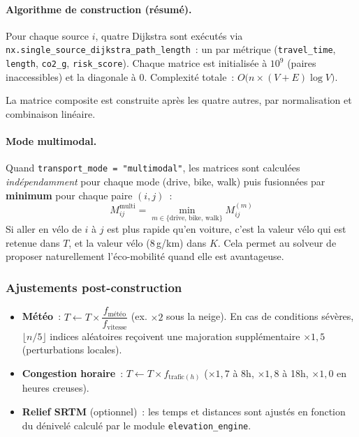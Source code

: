 \documentclass[a4paper, 12pt, twoside]{article}
\begin{document}
\paragraph{Algorithme de construction (r\'{e}sum\'{e}).}

Pour chaque source $i$, quatre Dijkstra sont ex\'{e}cut\'{e}s via
\texttt{nx.single\_source\_dijkstra\_path\_length}~:
un par m\'{e}trique (\texttt{travel\_time}, \texttt{length}, \texttt{co2\_g},
\texttt{risk\_score}).
Chaque matrice est initialis\'{e}e \`{a} $10^9$ (paires inaccessibles) et la diagonale
\`{a} 0. Complexit\'{e} totale~: $O\bigl(n \times (V + E) \log V\bigr)$.

La matrice composite est construite apr\`{e}s les quatre autres, par normalisation
et combinaison lin\'{e}aire.

\paragraph{Mode multimodal.}

Quand \texttt{transport\_mode = "multimodal"}, les matrices sont calcul\'{e}es
\emph{ind\'{e}pendamment} pour chaque mode (drive, bike, walk) puis fusionn\'{e}es
par \textbf{minimum} pour chaque paire $(i, j)$~:
\[
  M^{\text{multi}}_{ij} = \min_{m \in \{\text{drive, bike, walk}\}} M^{(m)}_{ij}
\]
Si aller en v\'{e}lo de $i$ \`{a} $j$ est plus rapide qu'en voiture, c'est la valeur
v\'{e}lo qui est retenue dans $T$, et la valeur v\'{e}lo (8\,g/km) dans $K$.
Cela permet au solveur de proposer naturellement l'\'{e}co-mobilit\'{e} quand elle est
avantageuse.

\subsubsection{Ajustements post-construction}

\begin{itemize}
  \item \textbf{M\'{e}t\'{e}o}~: $T \leftarrow T \times \dfrac{f_{\text{m\'{e}t\'{e}o}}}{f_{\text{vitesse}}}$
        (ex. $\times 2$ sous la neige). En cas de conditions s\'{e}v\`{e}res,
        $\lfloor n/5 \rfloor$ indices al\'{e}atoires re\c{c}oivent une majoration
        suppl\'{e}mentaire $\times 1{,}5$ (perturbations locales).
  \item \textbf{Congestion horaire}~: $T \leftarrow T \times f_{\text{trafic}(h)}$
        ($\times 1{,}7$ \`{a} 8h, $\times 1{,}8$ \`{a} 18h, $\times 1{,}0$ en heures creuses).
  \item \textbf{Relief SRTM} (optionnel)~: les temps et distances sont ajust\'{e}s
        en fonction du d\'{e}nivel\'{e} calcul\'{e} par le module \texttt{elevation\_engine}.
\end{itemize}
\end{document}
